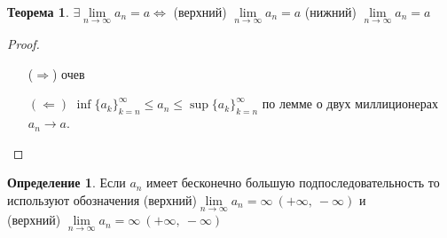 \documentclass[a4paper, 12pt]{article}
\newcommand{\lra}{\Leftrightarrow}
\newcommand{\lims}{\lim\limits_{n\to \infty}}
\theoremstyle{definition}
\newtheorem*{definition}{Определение}
\newtheorem*{theorem}{Теорема}
\begin{document}
        \begin{theorem}
            $\exists \lims a_n=a \lra$ (верхний) $\lims a_n =a$ (нижний) $\lims a_n=a$
        \end{theorem} 
        \begin{proof}
            \begin{itemize}
                \item[($\Rightarrow$)] очев
                \item[$(\Leftarrow)$] $\inf \{a_k\}_{k=n}^{\infty}\leq a_n\leq \sup \{a_k\}_{k=n}^{\infty}$ по лемме о двух миллиционерах $a_n \to a$. 
            \end{itemize}
        \end{proof} 
        \begin{definition}
            Если $a_n$ имеет бесконечно большую подпоследовательность то используют обозначения (верхний)$\lims a_n=\infty\ (+\infty,\ -\infty)$ и\\ (верхний) $\lims a_n=\infty\ (+\infty,\ -\infty)$
        \end{definition}
\end{document}
